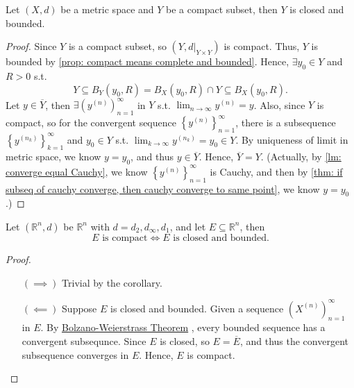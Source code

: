 \begin{corollary} \label{cl: compact subset of X is closed and bounded}
    Let \((X, d)\) be a metric space and \(Y\) be a compact subset, then \(Y\) is closed and bounded.    
\end{corollary}
\begin{proof}
    Since \(Y\) is a compact subset, so \(\left( Y, d\vert_{Y \times Y} \right) \) is compact. Thus, \(Y\) is bounded by  \autoref{prop: compact means complete and bounded}. Hence, \(\exists y_0 \in Y\) and \(R > 0\) s.t. 
    \[
        Y \subseteq B_Y(y_0, R) =  B_X(y_0, R) \cap Y \subseteq B_X(y_0, R).
    \]   
    Let \(y \in \overline{Y} \), then \(\exists \left( y^{(n)} \right)_{n=1}^{\infty}  \) in \(Y\) s.t. \(\lim_{n \to \infty} y^{(n)} = y \). Also, since \(Y\) is compact, so for the convergent sequence \(\left\{ y^{(n)} \right\}_{n=1}^{\infty}  \), there is a subsequence \(\left\{ y^{(n_k)} \right\}_{k=1}^{\infty}  \) and \(y_0 \in Y\)  s.t. \(\lim_{k \to \infty}  y^{(n_k)}= y_0 \in Y\). By uniqueness of limit in metric space, we know \(y = y_0\), and thus \(y \in \overline{Y} \). Hence, \(\overline{Y} = Y \). (Actually, by \autoref{lm: converge equal Cauchy}, we know \(\left\{ y^{(n)} \right\}_{n=1}^{\infty} \) is Cauchy, and then by \autoref{thm: if subseq of cauchy converge, then cauchy converge to same point}, we know \(y = y_0\).)    
\end{proof}

\begin{theorem} \label{thm: Heine Borel thm}
    Let \(\left( \mathbb{R} ^n, d \right) \) be \(\mathbb{R} ^n\) with \(d = d_2, d_\infty , d_1\), and let \(E \subseteq \mathbb{R} ^n\), then 
    \[
        E \text{ is compact} \iff E \text{ is closed and bounded}.
    \]  
\end{theorem}
\begin{proof}
    \vphantom{text}
    \begin{itemize}
        \item [\((\implies )\)] Trivial by the corollary. 
        \item [\((\impliedby )\)] Suppose \(E\) is closed and bounded. Given a sequence \(\left( X^{(n)} \right)_{n=1}^{\infty}  \) in \(E\). By \hyperref[thm: Bolzano Weierstrass thm]{Bolzano-Weierstrass Theorem} , every bounded sequence has a convergent subsequnce. Since \(E\) is closed, so \(E = \overline{E} \), and thus the convergent subsequence converges in \(E\). Hence, \(E\) is compact.   
    \end{itemize}
\end{proof}

